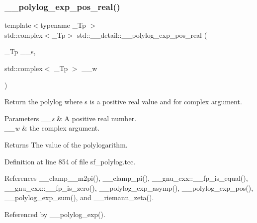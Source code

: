 \subsubsection{\texorpdfstring{\+\_\+\+\_\+polylog\+\_\+exp\+\_\+pos\+\_\+real()}{\_\_polylog\_exp\_pos\_real()}\hspace{0.1cm}{\footnotesize\ttfamily [1/2]}}
{\footnotesize\ttfamily template$<$typename \+\_\+\+Tp $>$ \\
std\+::complex$<$\+\_\+\+Tp$>$ std\+::\+\_\+\+\_\+detail\+::\+\_\+\+\_\+polylog\+\_\+exp\+\_\+pos\+\_\+real (\begin{DoxyParamCaption}\item[{\+\_\+\+Tp}]{\+\_\+\+\_\+s,  }\item[{std\+::complex$<$ \+\_\+\+Tp $>$}]{\+\_\+\+\_\+w }\end{DoxyParamCaption})}

Return the polylog where s is a positive real value and for complex argument.


\begin{DoxyParams}{Parameters}
{\em \+\_\+\+\_\+s} & A positive real number. \\
\hline
{\em \+\_\+\+\_\+w} & the complex argument. \\
\hline
\end{DoxyParams}
\begin{DoxyReturn}{Returns}
The value of the polylogarithm. 
\end{DoxyReturn}


Definition at line 854 of file sf\+\_\+polylog.\+tcc.



References \+\_\+\+\_\+clamp\+\_\+\_\+m2pi(), \+\_\+\+\_\+clamp\+\_\+pi(), \+\_\+\+\_\+gnu\+\_\+cxx\+::\+\_\+\+\_\+fp\+\_\+is\+\_\+equal(), \+\_\+\+\_\+gnu\+\_\+cxx\+::\+\_\+\+\_\+fp\+\_\+is\+\_\+zero(), \+\_\+\+\_\+polylog\+\_\+exp\+\_\+asymp(), \+\_\+\+\_\+polylog\+\_\+exp\+\_\+pos(), \+\_\+\+\_\+polylog\+\_\+exp\+\_\+sum(), and \+\_\+\+\_\+riemann\+\_\+zeta().



Referenced by \+\_\+\+\_\+polylog\+\_\+exp().

\mbox{\label{namespacestd_1_1____detail_a8a6390a3855283fc27a5d57dd736b62e}} 

